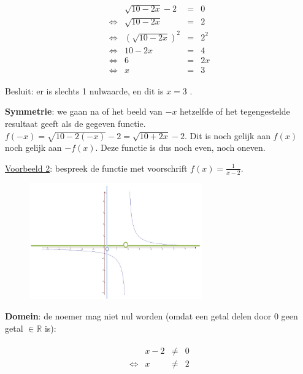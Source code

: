 \noindent 
\begin{eqnarray*}
	\begin{array}{cccc}
		& \sqrt{10-2x}-2 & = & 0\\
		\iff & \sqrt{10-2x} & = & 2\\
		\iff & \left(\sqrt{10-2x}\right)^{2} & = & 2^{2}\\
		\iff & 10-2x & = & 4\\
		\iff & 6 & = & 2x\\
		\iff & x & = & 3
	\end{array}
\end{eqnarray*}


\noindent Besluit: er is slechts 1 nulwaarde, en dit is $x=3$ .

\medskip{}


\noindent \textbf{Symmetrie}: we gaan na of het beeld van $-x$ hetzelfde
of het tegengestelde resultaat geeft als de gegeven functie. $f(-x)=\sqrt{10-2(-x)}-2=\sqrt{10+2x}-2$.
Dit is noch gelijk aan $f(x)$ noch gelijk aan $-f(x)$. Deze functie
is dus noch even, noch oneven.

\noindent \bigskip{}


\noindent \uline{Voorbeeld 2}: bespreek de functie met voorschrift $f(x)=\frac{1}{x-2}$.

\begin{figure}[h]
	\centering{}\includegraphics[height=5cm]{2_elem_rekenvaardigheden_B/inputs/reeel_vb2.jpg} 
\end{figure}


\noindent \textbf{Domein}: de noemer mag niet nul worden (omdat een
getal delen door $0$ geen getal $\in \mathbb{R}$ is):

\noindent 
\begin{eqnarray*}
	\begin{array}{cccc}
		& x-2 & \neq & 0\\
		\iff & x & \neq & 2
	\end{array}
\end{eqnarray*}


